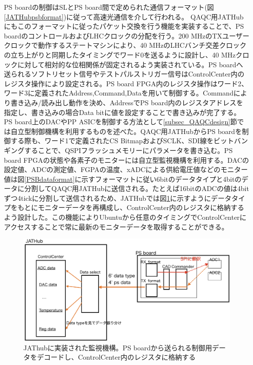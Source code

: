 PS boardの制御はSLとPS board間で定められた通信フォーマット(図\ref{JATHubpsbformat})に従って高速光通信を介して行われる。
QAQC用JATHubにもこのフォーマットに従ったパケット交換を行う機能を実装することで、PS boardのコントロールおよびLHCクロックの分配を行う。200 MHzのTXユーザークロックで動作するステートマシンにより、40 MHzのLHCバンチ交差クロックの立ち上がりと同期したタイミングでワード0を送るように設計し、40 MHzクロックに対して相対的な位相関係が固定されるよう実装されている。PS boardへ送られるソフトリセット信号やテストパルストリガー信号はControlCenter内のレジスタ操作により設定される。PS board FPGA内のレジスタ操作はワード2、ワード3に定義されたAddress,Command,Dataを用いて制御する。Commandにより書き込み/読み出し動作を決め、AddressでPS board内のレジスタアドレスを指定し、書き込みの場合Data bitに値を設定することで書き込みが完了する。
PS board上のDACやPP ASICを制御する方法として\ref{subsec_QAQCdesign}節では自立型制御機構を利用するものを述べた。QAQC用JATHubからPS boardを制御する際も、ワード1で定義されたCS BitmapおよびSCLK、SDI線をビットバンギングすることで、QSPIフラッシュメモリーにパラメータを書き込む。PS board FPGAの状態や各素子のモニターには自立型監視機構を利用する。DACの設定値、ADCの測定値、FGPAの温度、xADCによる供給電圧値などのモニター値は図\ref{PSBdataformat}に示すフォーマットに従い6bitのデータタイプと4bitのデータに分割してQAQC用JATHubに送信される。たとえば16bitのADCの値は4bitずつ4tickに分割して送信されるため、JATHubでは図\ref{JATHubmonitor}に示すようにデータタイプをもとにモニターデータを再構成し、ControlCenter内のレジスタに格納するよう設計した。この機能によりUbuntuから任意のタイミングでControlCenterにアクセスすることで常に最新のモニターデータを取得することができる。
\baselineskip

\begin{figure} 
\centering
\includegraphics[width=16cm]{fig/QAQC/JATHubmonitor.png}
\caption[JATHub monitor]{JAThubに実装された監視機構。PS boardから送られる制御用データをデコードし、ControlCenter内のレジスタに格納する}
\label{JATHubmonitor}
\end{figure}

